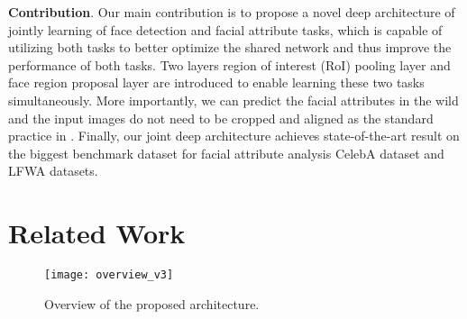 \documentclass[10pt,twocolumn,letterpaper]{article}
\begin{document}
\vspace{0.05in}

\noindent \textbf{Contribution}. Our main contribution is to propose
a novel deep architecture of jointly learning of face detection
and facial attribute tasks, which is capable of utilizing both tasks
to better optimize the shared network and thus improve the performance
of both tasks. Two layers \textendash{} region of interest (RoI)
pooling layer and face region proposal layer are introduced to enable learning these two tasks simultaneously. More importantly, we
can predict the facial attributes in the wild and the input images
do not need to be cropped and aligned as the standard practice in \cite{rudd2016moon,wang2016walk}.
Finally, our joint deep architecture achieves state-of-the-art result
on the biggest benchmark dataset for facial attribute analysis\textendash{}
CelebA dataset \cite{liu2015deep} and LFWA \cite{liu2015deep,huang2007labeled}
datasets. 

\section{Related Work}

\begin{figure*}[t]
\begin{centering}
 \texttt{[image: overview\_v3]}
\par\end{centering}
\caption{Overview of the proposed architecture. }
\label{network_structure} 
\end{figure*}
\end{document}
